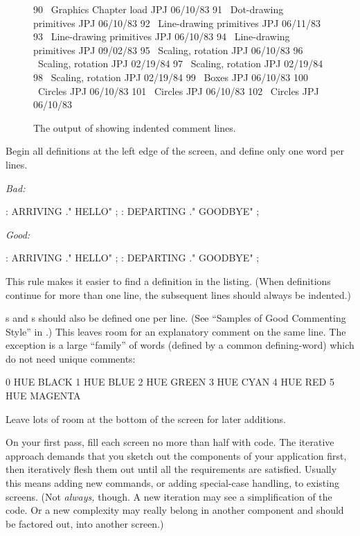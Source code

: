 \begin{figure*}[bbbb]
\caption{The output of  showing indented comment lines.}
\begin{Code}
 90 \ Graphics           Chapter load               JPJ 06/10/83
 91    \ Dot-drawing primitives                     JPJ 06/10/83
 92 \ Line-drawing primitives                       JPJ 06/11/83
 93    \ Line-drawing primitives                    JPJ 06/10/83
 94    \ Line-drawing primitives                    JPJ 09/02/83
 95 \ Scaling, rotation                             JPJ 06/10/83
 96    \ Scaling, rotation                          JPJ 02/19/84
 97    \ Scaling, rotation                          JPJ 02/19/84
 98    \ Scaling, rotation                          JPJ 02/19/84
 99 \ Boxes                                         JPJ 06/10/83
100 \ Circles                                       JPJ 06/10/83
101    \ Circles                                    JPJ 06/10/83
102    \ Circles                                    JPJ 06/10/83
\end{Code}
\end{figure*}

\begin{tip}
Begin all definitions at the left edge of the screen, and define only
one word per lines.
\end{tip}
\noindent \emph{Bad:}
\begin{Code}
: ARRIVING   ." HELLO" ;   : DEPARTING   ." GOODBYE" ;
\end{Code}
\noindent \emph{Good:}
\begin{Code}
: ARRIVING   ." HELLO" ;
: DEPARTING   ." GOODBYE" ;
\end{Code}
This rule makes it easier to find a definition in the listing.  (When
definitions continue for more than one line, the subsequent lines
should always be indented.)

s and s should also be defined one per
line.  (See ``Samples of Good Commenting Style'' in .) This
leaves room for an explanatory comment on the same line.  The
exception is a large ``family'' of words (defined by a common
defining-word) which do not need unique comments:
\begin{Code}
0 HUE BLACK     1 HUE BLUE      2 HUE GREEN
3 HUE CYAN      4 HUE RED       5 HUE MAGENTA
\end{Code}
\begin{tip}
Leave lots of room at the bottom of the screen for later additions.
\end{tip}
On your first pass, fill each screen no more than half with code.  The
iterative approach demands that you sketch out the components of your
application first, then iteratively flesh them out until all the
requirements are satisfied.  Usually this means adding new commands,
or adding special-case handling, to existing screens.  (Not
\emph{always,} though.  A new iteration may see a simplification of
the code. Or a new complexity may really belong in another component
and should be factored out, into another screen.)

